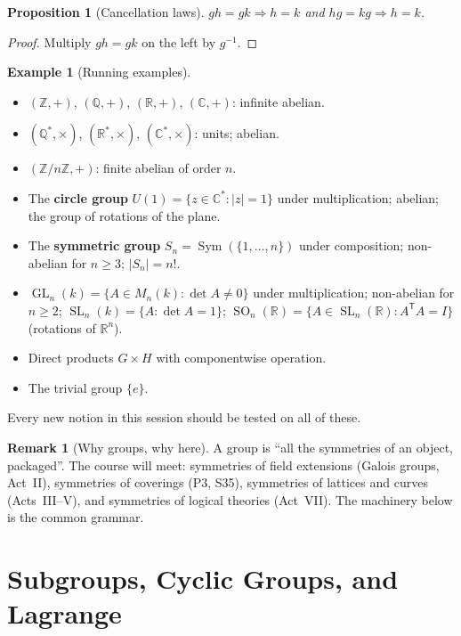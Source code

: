 \documentclass[11pt,a4paper]{article}
\newtheorem{proposition}[theorem]{Proposition}
\theoremstyle{definition}
\newtheorem{example}[theorem]{Example}
\newtheorem{remark}[theorem]{Remark}
\newcommand{\Z}{\mathbb{Z}}
\newcommand{\Q}{\mathbb{Q}}
\newcommand{\R}{\mathbb{R}}
\newcommand{\C}{\mathbb{C}}
\newcommand{\GL}{\operatorname{GL}}
\newcommand{\SL}{\operatorname{SL}}
\newcommand{\SO}{\operatorname{SO}}
\newcommand{\Sym}{\operatorname{Sym}}
\begin{document}
	\begin{proposition}[Cancellation laws]
		$gh=gk\Rightarrow h=k$ and $hg=kg\Rightarrow h=k$.
	\end{proposition}
	\begin{proof}
		Multiply $gh=gk$ on the left by $g^{-1}$.
	\end{proof}
	
	\begin{example}[Running examples]\label{ex:groups}
		\begin{itemize}
			\item $(\Z,+)$, $(\Q,+)$, $(\R,+)$, $(\C,+)$: infinite abelian.
			\item $(\Q^*,\times)$, $(\R^*,\times)$, $(\C^*,\times)$: units; abelian.
			\item $(\Z/n\Z,+)$: finite abelian of order $n$.
			\item The \textbf{circle group} $U(1)=\{z\in\C^*:|z|=1\}$ under multiplication; abelian; the group of rotations of the plane.
			\item The \textbf{symmetric group} $S_n=\Sym(\{1,\dots,n\})$ under composition; non-abelian for $n\ge3$; $|S_n|=n!$.
			\item $\GL_n(k)=\{A\in M_n(k):\det A\neq0\}$ under multiplication; non-abelian for $n\ge2$;
			$\SL_n(k)=\{A:\det A=1\}$; $\SO_n(\R)=\{A\in\SL_n(\R):A^{\mathsf T}A=I\}$ (rotations of $\R^n$).
			\item Direct products $G\times H$ with componentwise operation.
			\item The trivial group $\{e\}$.
		\end{itemize}
		Every new notion in this session should be tested on all of these.
	\end{example}
	
	\begin{remark}[Why groups, why here]
		A group is ``all the symmetries of an object, packaged''. The course will meet: symmetries of field
		extensions (Galois groups, Act~II), symmetries of coverings (P3, S35), symmetries of lattices and
		curves (Acts~III--V), and symmetries of logical theories (Act~VII). The machinery below is the
		common grammar.
	\end{remark}
	
	\section{Subgroups, Cyclic Groups, and Lagrange}
	
\end{document}
